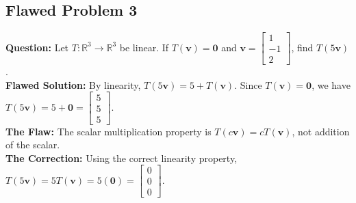 \documentclass[11pt]{article}
\begin{document}
\subsection{Flawed Problem 3}
\textbf{Question:} Let $T: \mathbb{R}^3 \to \mathbb{R}^3$ be linear. If $T(\mathbf{v}) = \mathbf{0}$ and $\mathbf{v} = \begin{bmatrix} 1 \\ -1 \\ 2 \end{bmatrix}$, find $T(5\mathbf{v})$. \\
\textbf{Flawed Solution:} By linearity, $T(5\mathbf{v}) = 5 + T(\mathbf{v})$. Since $T(\mathbf{v}) = \mathbf{0}$, we have $T(5\mathbf{v}) = 5 + \mathbf{0} = \begin{bmatrix} 5 \\ 5 \\ 5 \end{bmatrix}$. \\
\textbf{The Flaw:} The scalar multiplication property is $T(c\mathbf{v}) = cT(\mathbf{v})$, not addition of the scalar. \\
\textbf{The Correction:} Using the correct linearity property, $T(5\mathbf{v}) = 5T(\mathbf{v}) = 5(\mathbf{0}) = \begin{bmatrix} 0 \\ 0 \\ 0 \end{bmatrix}$.
\end{document}
